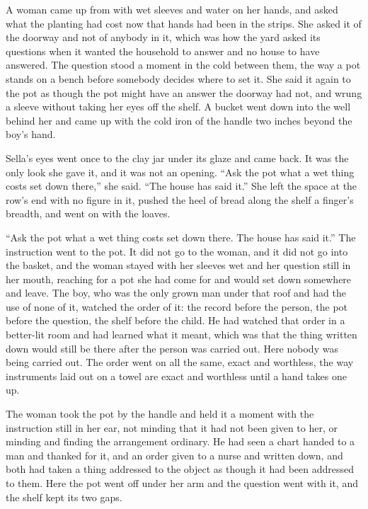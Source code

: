 \scenebreak

A woman came up from  with wet sleeves and water on her hands, and asked what the planting had cost now that hands had been in the strips. She asked it of the doorway and not of anybody in it, which was how the yard asked its questions when it wanted the household to answer and no house to have answered. The question stood a moment in the cold between them, the way a pot stands on a bench before somebody decides where to set it. She said it again to the pot as though the pot might have an answer the doorway had not, and wrung a sleeve without taking her eyes off the shelf. A bucket went down into the well behind her and came up with the cold iron of the handle two inches beyond the boy's hand.

Sella's eyes went once to the clay jar under its glaze and came back. It was the only look she gave it, and it was not an opening. “Ask the pot what a wet thing costs set down there,” she said. “The house has said it.” She left the space at the row's end with no figure in it, pushed the heel of bread along the shelf a finger's breadth, and went on with the loaves.

“Ask the pot what a wet thing costs set down there. The house has said it.” The instruction went to the pot. It did not go to the woman, and it did not go into the basket, and the woman stayed with her sleeves wet and her question still in her mouth, reaching for a pot she had come for and would set down somewhere and leave. The boy, who was the only grown man under that roof and had the use of none of it, watched the order of it: the record before the person, the pot before the question, the shelf before the child. He had watched that order in a better-lit room and had learned what it meant, which was that the thing written down would still be there after the person was carried out. Here nobody was being carried out. The order went on all the same, exact and worthless, the way instruments laid out on a towel are exact and worthless until a hand takes one up.

The woman took the pot by the handle and held it a moment with the instruction still in her ear, not minding that it had not been given to her, or minding and finding the arrangement ordinary. He had seen a chart handed to a man and thanked for it, and an order given to a nurse and written down, and both had taken a thing addressed to the object as though it had been addressed to them. Here the pot went off under her arm and the question went with it, and the shelf kept its two gaps.

